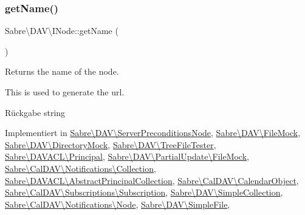 \subsubsection{\texorpdfstring{get\+Name()}{getName()}}
{\footnotesize\ttfamily Sabre\textbackslash{}\+D\+A\+V\textbackslash{}\+I\+Node\+::get\+Name (\begin{DoxyParamCaption}{ }\end{DoxyParamCaption})}

Returns the name of the node.

This is used to generate the url.

\begin{DoxyReturn}{Rückgabe}
string 
\end{DoxyReturn}


Implementiert in \mbox{\hyperlink{class_sabre_1_1_d_a_v_1_1_server_preconditions_node_a9ce3a4066f4fd316af509df2aea3ca69}{Sabre\textbackslash{}\+D\+A\+V\textbackslash{}\+Server\+Preconditions\+Node}}, \mbox{\hyperlink{class_sabre_1_1_d_a_v_1_1_file_mock_a63ef619b943fbd2f3669aa0406763f00}{Sabre\textbackslash{}\+D\+A\+V\textbackslash{}\+File\+Mock}}, \mbox{\hyperlink{class_sabre_1_1_d_a_v_1_1_directory_mock_af234ab67cb7373a91e5f6f00ba3fd502}{Sabre\textbackslash{}\+D\+A\+V\textbackslash{}\+Directory\+Mock}}, \mbox{\hyperlink{class_sabre_1_1_d_a_v_1_1_tree_file_tester_a19625a861e0ecb02a986f61d3e097075}{Sabre\textbackslash{}\+D\+A\+V\textbackslash{}\+Tree\+File\+Tester}}, \mbox{\hyperlink{class_sabre_1_1_d_a_v_a_c_l_1_1_principal_a87c0a0ee299336eca2d79f46662bfe84}{Sabre\textbackslash{}\+D\+A\+V\+A\+C\+L\textbackslash{}\+Principal}}, \mbox{\hyperlink{class_sabre_1_1_d_a_v_1_1_partial_update_1_1_file_mock_a9f6898974521e0424de1078d6e2a9096}{Sabre\textbackslash{}\+D\+A\+V\textbackslash{}\+Partial\+Update\textbackslash{}\+File\+Mock}}, \mbox{\hyperlink{class_sabre_1_1_cal_d_a_v_1_1_notifications_1_1_collection_a611b7fd53e6e29320c1a627bc964da3e}{Sabre\textbackslash{}\+Cal\+D\+A\+V\textbackslash{}\+Notifications\textbackslash{}\+Collection}}, \mbox{\hyperlink{class_sabre_1_1_d_a_v_a_c_l_1_1_abstract_principal_collection_aa6aad4134ae5461bb47df0afd6547c9e}{Sabre\textbackslash{}\+D\+A\+V\+A\+C\+L\textbackslash{}\+Abstract\+Principal\+Collection}}, \mbox{\hyperlink{class_sabre_1_1_cal_d_a_v_1_1_calendar_object_a99fc7894745ccc28aff30a587f39536b}{Sabre\textbackslash{}\+Cal\+D\+A\+V\textbackslash{}\+Calendar\+Object}}, \mbox{\hyperlink{class_sabre_1_1_cal_d_a_v_1_1_subscriptions_1_1_subscription_afcc333214388d83a3c365965c45eebea}{Sabre\textbackslash{}\+Cal\+D\+A\+V\textbackslash{}\+Subscriptions\textbackslash{}\+Subscription}}, \mbox{\hyperlink{class_sabre_1_1_d_a_v_1_1_simple_collection_ae558cd8d61b0c9d927e7fe7b77c761d7}{Sabre\textbackslash{}\+D\+A\+V\textbackslash{}\+Simple\+Collection}}, \mbox{\hyperlink{class_sabre_1_1_cal_d_a_v_1_1_notifications_1_1_node_a9f663d8cbb8ea36a50cdad6c46fa288a}{Sabre\textbackslash{}\+Cal\+D\+A\+V\textbackslash{}\+Notifications\textbackslash{}\+Node}}, \mbox{\hyperlink{class_sabre_1_1_d_a_v_1_1_simple_file_a57c28fd3a5bd1437a816030ba46111b6}{Sabre\textbackslash{}\+D\+A\+V\textbackslash{}\+Simple\+File}}, 